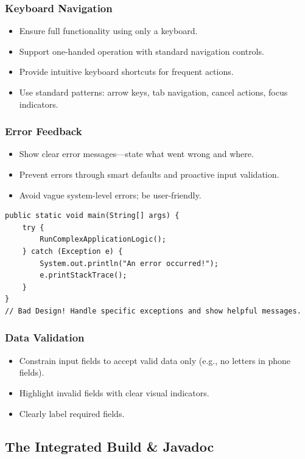 \documentclass{article}
\begin{document}
\subsubsection{Keyboard Navigation}
\begin{itemize}
  \item Ensure full functionality using only a keyboard.
  \item Support one-handed operation with standard navigation controls.
  \item Provide intuitive keyboard shortcuts for frequent actions.
  \item Use standard patterns: arrow keys, tab navigation, cancel actions, focus indicators.
\end{itemize}

\subsubsection{Error Feedback}
\begin{itemize}
  \item Show clear error messages—state what went wrong and where.
  \item Prevent errors through smart defaults and proactive input validation.
  \item Avoid vague system-level errors; be user-friendly.
\end{itemize}

\begin{verbatim}
public static void main(String[] args) {
    try {
        RunComplexApplicationLogic();
    } catch (Exception e) {
        System.out.println("An error occurred!");
        e.printStackTrace();
    }
}
// Bad Design! Handle specific exceptions and show helpful messages.
\end{verbatim}

\subsubsection{Data Validation}
\begin{itemize}
  \item Constrain input fields to accept valid data only (e.g., no letters in phone fields).
  \item Highlight invalid fields with clear visual indicators.
  \item Clearly label required fields.
\end{itemize}

\subsection{The Integrated Build \& Javadoc}
\end{document}
